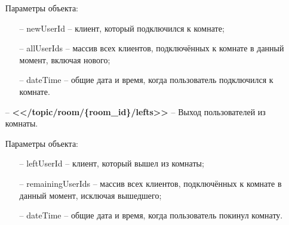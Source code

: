 \documentclass{../includes/TechDoc}
\begin{document}
\begin{itemize}
    	Параметры объекта:
    	\begin{itemize}[noitemsep]
    		\item[--] newUserId -- клиент, который подключился к комнате;
    		\item[--] allUserIds -- массив всех клиентов, подключённых к комнате в данный момент, включая нового;
    		\item[--] dateTime -- общие дата и время, когда пользователь подключился к комнате.
    	\end{itemize}
    	\item[--] \textbf{<</topic/room/\{room\_id\}/lefts>>} -- Выход пользователей из комнаты.

    	Параметры объекта:
    	\begin{itemize}[noitemsep]
    		\item[--] leftUserId -- клиент, который вышел из комнаты;
    		\item[--] remainingUserIds -- массив всех клиентов, подключённых к комнате в данный момент, исключая вышедшего;
    		\item[--] dateTime -- общие дата и время, когда пользователь покинул комнату.
    	\end{itemize}
    \end{itemize}
\end{document}
